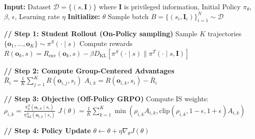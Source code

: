 \begin{algorithm}[t]
\caption{On-Policy Self-Distillation}
\label{alg:self_distill_on_policy}
\begin{algorithmic}[1]
\STATE \textbf{Input:} Dataset $\mathcal{D} = \{(s, \mathbf{I})\}$ where $\mathbf{I}$ is privileged information, Initial Policy $\pi_\theta$, $\beta$, $\epsilon$, Learning rate $\eta$
\STATE \textbf{Initialize:} $\theta$ 
    \STATE Sample batch $B = \{(s_i, \mathbf{I}_i)\}_{i=1}^N \sim \mathcal{D}$
    
    \STATE \textbf{// Step 1: Student Rollout (On-Policy sampling)}
        \STATE Sample $K$ trajectories $\{\mathbf{o}_1, \dots, \mathbf{o}_K\} \sim \pi^S(\cdot \mid s)$
        \STATE {}
        \STATE Compute rewards $R(\mathbf{o}_k, s) = R_{\text{env}}(\mathbf{o}_k, s) - \beta D_{\text{KL}} \left[ \pi^S(\cdot \mid s) \| \pi^T(\cdot \mid s, \mathbf{I}) \right]$
    \ENDFOR
    
    \STATE \textbf{// Step 2: Compute Group-Centered Advantages}
        \STATE $\bar{R}_i = \frac{1}{K}\sum_{j=1}^K R(\mathbf{o}_{i,j}, s_i)$
            \STATE $A_{i,k} = R(\mathbf{o}_{i,k}, s_i) - \bar{R}_i$
        \ENDFOR
    \ENDFOR
    
    \STATE \textbf{// Step 3: Objective (Off-Policy GRPO)}
    \STATE Compute IS weights: $\rho_{i,k} = \frac{\pi^S_\theta(\mathbf{o}_{i,k} \mid s_i)}{\pi^S_{\text{old}}(\mathbf{o}_{i,k} \mid s_i)}$
    \STATE $J(\theta) = \frac{1}{K} \sum_{k=1}^K \min \left( \rho_{i,k} A_{i,k}, \text{clip}(\rho_{i,k}, 1-\epsilon, 1+\epsilon) A_{i,k} \right)$
    
    \STATE \textbf{// Step 4: Policy Update}
    \STATE $\theta \leftarrow \theta + \eta \nabla_\theta J(\theta)$
\ENDWHILE
\end{algorithmic}
\end{algorithm}

